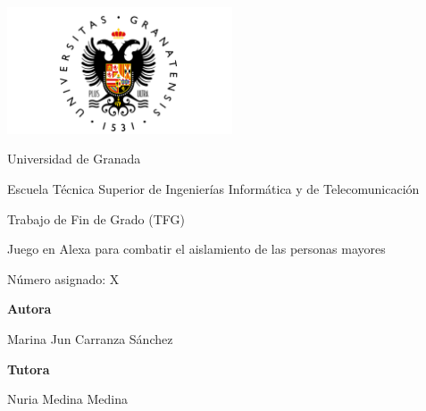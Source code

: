 \documentclass[12pt]{article}
\begin{document}
\begin{titlepage}
    \centering
    \begin{minipage}{1\textwidth}
        \raisebox{-0.7\height}
        {\includegraphics[width=0.5\textwidth]{UGR-Logo}}
    \end{minipage}
   
    \vspace{1.5cm}

    {\LARGE Universidad de Granada \par}
    \vspace{0.5cm}

    {\Large Escuela Técnica Superior de Ingenierías Informática y de Telecomunicación \par}

    \vspace{1.5cm}
    
    {\LARGE {Trabajo de Fin de Grado (TFG)} \par}
    \vspace{1cm}

    {\Huge Juego en Alexa para combatir el aislamiento de las personas mayores \par}
    
    \vspace{2cm}

    {\Large Número asignado: X \par}
    \vfill
    \vfill

    {\Large \textbf{Autora} \par}
    {\Large Marina Jun Carranza Sánchez \par}
    \vspace{0.5cm}

    {\Large \textbf{Tutora} \par}
    {\Large Nuria Medina Medina \par}
    
\end{titlepage}
\end{document}
